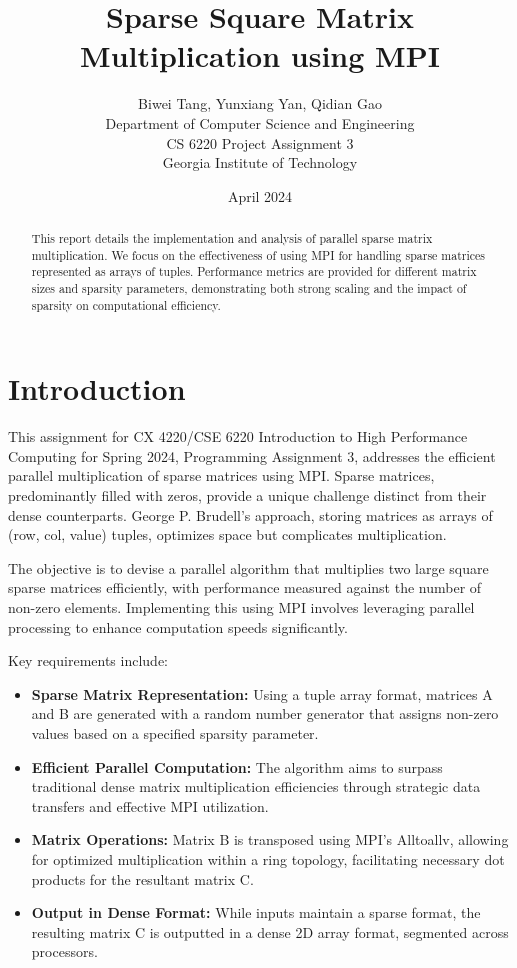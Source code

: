 \documentclass{article}
\title{Sparse Square Matrix Multiplication using MPI}
\author{
  Biwei Tang, Yunxiang Yan, Qidian Gao \\
  Department of Computer Science and Engineering \\
  CS 6220 Project Assignment 3\\
  Georgia Institute of Technology
}
\date{April 2024}
\begin{document}
\maketitle

\begin{abstract}
    This report details the implementation and analysis of parallel sparse matrix multiplication. We focus on the effectiveness of using MPI for handling sparse matrices represented as arrays of tuples. Performance metrics are provided for different matrix sizes and sparsity parameters, demonstrating both strong scaling and the impact of sparsity on computational efficiency.
\end{abstract}

\section{Introduction}

This assignment for CX 4220/CSE 6220 Introduction to High Performance Computing for Spring 2024, Programming Assignment 3, addresses the efficient parallel multiplication of sparse matrices using MPI. Sparse matrices, predominantly filled with zeros, provide a unique challenge distinct from their dense counterparts. George P. Brudell's approach, storing matrices as arrays of (row, col, value) tuples, optimizes space but complicates multiplication.

The objective is to devise a parallel algorithm that multiplies two large square sparse matrices efficiently, with performance measured against the number of non-zero elements. Implementing this using MPI involves leveraging parallel processing to enhance computation speeds significantly.

Key requirements include:
\begin{itemize}
    \item \textbf{Sparse Matrix Representation:} Using a tuple array format, matrices A and B are generated with a random number generator that assigns non-zero values based on a specified sparsity parameter.
    \item \textbf{Efficient Parallel Computation:} The algorithm aims to surpass traditional dense matrix multiplication efficiencies through strategic data transfers and effective MPI utilization.
    \item \textbf{Matrix Operations:} Matrix B is transposed using MPI's Alltoallv, allowing for optimized multiplication within a ring topology, facilitating necessary dot products for the resultant matrix C.
    \item \textbf{Output in Dense Format:} While inputs maintain a sparse format, the resulting matrix C is outputted in a dense 2D array format, segmented across processors.
\end{itemize}
\end{document}

